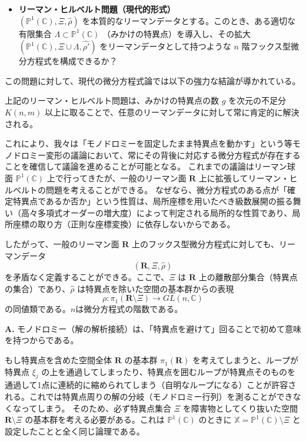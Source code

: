 \begin{itemize}
    \item[] \textbf{リーマン・ヒルベルト問題（現代的形式）} \\
    $(\mathbb{P}^{1}(\mathbb{C}), \Xi, \hat{\rho})$ を本質的なリーマンデータとする。このとき、ある適切な有限集合 $\Lambda \subset \mathbb{P}^{1}(\mathbb{C})$ （みかけの特異点）を導入し、その拡大 $(\mathbb{P}^{1}(\mathbb{C}), \Xi \cup \Lambda, \hat{\rho'})$ をリーマンデータとして持つような $n$ 階フックス型微分方程式を構成できるか？
\end{itemize}

この問題に対して、現代の微分方程式論では以下の強力な結論が導かれている。

\begin{proposition}\label{prop:riemann_existence_theorem}
    上記のリーマン・ヒルベルト問題は、みかけの特異点の数 $g$ を次元の不足分 $K(n,m)$ 以上に取ることで、任意のリーマンデータに対して常に肯定的に解決される。
\end{proposition}

これにより、我々は「モノドロミーを固定したまま特異点を動かす」という等モノドロミー変形の議論において、常にその背後に対応する微分方程式が存在することを確信して議論を進めることが可能となる。
これまでの議論はリーマン球面 $\mathbb{P}^{1}(\mathbb{C})$ 上で行ってきたが、一般のリーマン面 $\mathbf{R}$ 上に拡張してリーマン・ヒルベルトの問題を考えることができる。
なぜなら、微分方程式のある点が「確定特異点であるか否か」という性質は、局所座標を用いたべき級数展開の振る舞い（高々多項式オーダーの増大度）によって判定される局所的な性質であり、局所座標の取り方（正則な座標変換）に依存しないからである。

したがって、一般のリーマン面 $\mathbf{R}$ 上のフックス型微分方程式に対しても、リーマンデータ
\[
(\mathbf{R}, \Xi, \hat{\rho})
\]
を矛盾なく定義することができる。ここで、$\Xi$ は $\mathbf{R}$ 上の離散部分集合（特異点の集合）であり、$\hat{\rho}$ は特異点を除いた空間の基本群からの表現
\[
\rho : \pi_{1}(\mathbf{R} \setminus \Xi) \to GL(n, \mathbb{C})
\]
の同値類である。$n$は微分方程式の階数である。

\begin{Q}
\textbf{A.} モノドロミー（解の解析接続）は、「特異点を避けて」回ることで初めて意味を持つからである。

もし特異点を含めた空間全体 $\mathbf{R}$ の基本群 $\pi_{1}(\mathbf{R})$ を考えてしまうと、ループが特異点 $\xi_j$ の上を通過してしまったり、特異点を囲むループが特異点そのものを通過して1点に連続的に縮められてしまう（自明なループになる）ことが許容される。これでは特異点周りの解の分岐（モノドロミー行列）を測ることができなくなってしまう。
そのため、必ず特異点集合 $\Xi$ を障害物としてくり抜いた空間 $\mathbf{R} \setminus \Xi$ の基本群を考える必要がある。これは $\mathbb{P}^{1}(\mathbb{C})$ のときに $\mathbb{X} = \mathbb{P}^{1}(\mathbb{C}) \setminus \Xi$ と設定したことと全く同じ論理である。
\end{Q}

